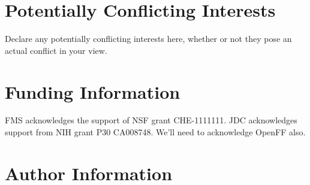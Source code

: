\documentclass[9pt,bestpractices]{livecoms}
\begin{document}
\section{Potentially Conflicting Interests}

Declare any potentially conflicting interests here, whether or not they pose an actual conflict in your view.

\section{Funding Information}
FMS acknowledges the support of NSF grant CHE-1111111.
JDC acknowledges support from NIH grant P30 CA008748.
We’ll need to acknowledge OpenFF also.

\section*{Author Information}
\makeorcid




\end{document}
